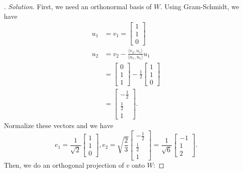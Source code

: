 \documentclass[11pt]{article}
\begin{document}
\begin{itemize}
        \begin{proof}[\unskip\nopunct]
            \emph{Solution.} First, we need an orthonormal basis of $W$. Using Gram-Schmidt, we have 
            \begin{align*}
                u_1 &= v_1 = \begin{bmatrix}
                    1 \\ 1 \\ 0
                \end{bmatrix} \\
                u_2 &= v_2 - \frac{\langle v_2, u_1 \rangle}{\langle u_1, u_1 \rangle} u_1 \\
                    &= \begin{bmatrix}
                        0 \\ 1 \\ 1
                    \end{bmatrix} - \frac{1}{2} \begin{bmatrix}
                        1 \\ 1 \\ 0
                    \end{bmatrix} \\
                    &= \begin{bmatrix}
                        - \frac{1}{2} \\ \frac{1}{2} \\ 1
                    \end{bmatrix}.
            \end{align*}
            Normalize these vectors and we have \[e_1 = \frac{1}{\sqrt{2}} \begin{bmatrix}
                1 \\ 1 \\ 0
            \end{bmatrix}, e_2 = \sqrt{\frac{2}{3}} \begin{bmatrix}
                - \frac{1}{2} \\ \frac{1}{2} \\ 1
            \end{bmatrix} = \frac{1}{\sqrt{6}} \begin{bmatrix}
                -1 \\ 1 \\ 2
            \end{bmatrix}.\] Then, we do an orthogonal projection of $v$ onto $W$:
    

\end{proof}
\end{itemize}
\end{document}

